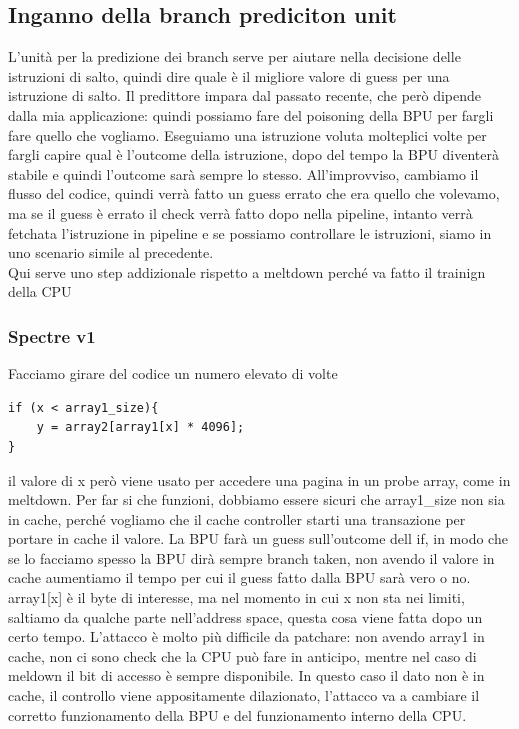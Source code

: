\documentclass[12pt, oneside]{extbook} %
\begin{document}
\subsection{Inganno della branch prediciton unit}
L'unità per la predizione dei branch serve per aiutare nella decisione delle istruzioni di salto, quindi dire quale è il migliore valore di guess per una istruzione di salto. Il predittore impara dal passato recente, che però dipende dalla mia applicazione: quindi possiamo fare del poisoning della BPU per fargli fare quello che vogliamo. Eseguiamo una istruzione voluta molteplici volte per fargli capire qual è l'outcome della istruzione, dopo del tempo la BPU diventerà stabile e quindi l'outcome sarà sempre lo stesso. All'improvviso, cambiamo il flusso del codice, quindi verrà fatto un guess errato che era quello che volevamo, ma se il guess è errato il check verrà fatto dopo nella pipeline, intanto verrà fetchata l'istruzione in pipeline e se possiamo controllare le istruzioni, siamo in uno scenario simile al precedente.\\ Qui serve uno step addizionale rispetto a meltdown perché va fatto il trainign della CPU
\subsubsection{Spectre v1}
Facciamo girare del codice un numero elevato di volte
\begin{lstlisting}
if (x < array1_size){
	y = array2[array1[x] * 4096];
}
\end{lstlisting}
il valore di x però viene usato per accedere una pagina in un probe array, come in meltdown. Per far si che funzioni, dobbiamo essere sicuri che \textsf{array1\_size} non sia in cache, perché vogliamo che il cache controller starti una transazione per portare in cache il valore. La BPU farà un guess sull'outcome dell if, in modo che se lo facciamo spesso la BPU dirà sempre branch taken, non avendo il valore in cache aumentiamo il tempo per cui il guess fatto dalla BPU sarà vero o no. \textsf{array1[x]} è il byte di interesse, ma nel momento in cui x non sta nei limiti, saltiamo da qualche parte nell'address space, questa cosa viene fatta dopo un certo tempo.  L'attacco è molto più difficile da patchare: non avendo array1 in cache, non ci sono check che la CPU può fare in anticipo, mentre nel caso di meldown il bit di accesso è sempre disponibile. In questo caso il dato non è in cache, il controllo viene appositamente dilazionato, l'attacco va a cambiare il corretto funzionamento della BPU e del funzionamento interno della CPU.
\end{document}
